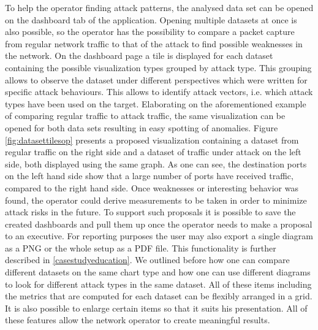 To help the operator finding attack patterns, the analysed data set can be opened on the dashboard tab of the application. Opening multiple datasets at once is also possible, so the operator has the possibility to compare a packet capture from regular network traffic to that of the attack to find possible weaknesses in the network. On the dashboard page a tile is displayed for each dataset containing the possible visualization types grouped by attack type. This grouping allows to observe the dataset under different perspectives which were written for specific attack behaviours. This allows to identify attack vectors, i.e. which attack types have been used on the target. Elaborating on the aforementioned example of comparing regular traffic to attack traffic, the same visualization can be opened for both data sets resulting in easy spotting of anomalies. Figure  \ref{fig:datasettilesop} presents a proposed visualization containing a dataset from regular traffic on the right side and a dataset of traffic under attack on the left side, both displayed using the same graph. As one can see, the destination ports on the left hand side show that a large number of ports have received traffic, compared to the right hand side.
Once weaknesses or interesting behavior was found, the operator could derive measurements to be taken in order to minimize attack risks in the future. To support such proposals it is possible to save the created dashboards and pull them up once the operator needs to make a proposal to an executive. For reporting purposes the user may also export a single diagram as a PNG or the whole setup as a PDF file. This functionality is further described in \ref{casestudyeducation}. We outlined before how one can compare different datasets on the same chart type and how one can use different diagrams to look for different attack types in the same dataset. All of these items including the metrics that are computed for each dataset can be flexibly arranged in a grid. It is also possible to enlarge certain items so that it suits his presentation. All of these features allow the network operator to create meaningful results. 

